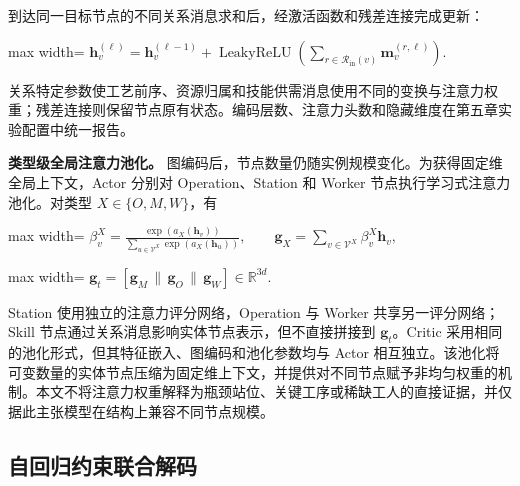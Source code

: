 \documentclass[journal,10pt]{IEEEtran}
\begin{document}
到达同一目标节点的不同关系消息求和后，经激活函数和残差连接完成更新：

\begin{center}
\begin{adjustbox}{max width=\columnwidth}
$\displaystyle
\mathbf h_v^{(\ell)}=
\mathbf h_v^{(\ell-1)}+
\operatorname{LeakyReLU}\!\left(
\sum_{r\in\mathcal R_{\mathrm{in}}(v)}
\mathbf m_v^{(r,\ell)}
\right).
$
\end{adjustbox}
\end{center}

关系特定参数使工艺前序、资源归属和技能供需消息使用不同的变换与注意力权重；残差连接则保留节点原有状态。编码层数、注意力头数和隐藏维度在第五章实验配置中统一报告。

\textbf{类型级全局注意力池化。} 图编码后，节点数量仍随实例规模变化。为获得固定维全局上下文，Actor 分别对 Operation、Station 和 Worker 节点执行学习式注意力池化。对类型 \(X\in\lbrace{}O,M,W\rbrace{}\)，有

\begin{center}
\begin{adjustbox}{max width=\columnwidth}
$\displaystyle
\beta_v^{X}=
\frac{\exp\!\left(a_X(\mathbf h_v)\right)}
{\displaystyle\sum_{u\in\mathcal V^{X}}
\exp\!\left(a_X(\mathbf h_u)\right)},
\qquad
\mathbf g_X=\sum_{v\in\mathcal V^{X}}\beta_v^{X}\mathbf h_v,
$
\end{adjustbox}
\end{center}

\begin{center}
\begin{adjustbox}{max width=\columnwidth}
$\displaystyle
\mathbf g_t=
\left[
\mathbf g_M\,\|\,\mathbf g_O\,\|\,\mathbf g_W
\right]\in\mathbb R^{3d}.
$
\end{adjustbox}
\end{center}

Station 使用独立的注意力评分网络，Operation 与 Worker 共享另一评分网络；Skill 节点通过关系消息影响实体节点表示，但不直接拼接到 \(\mathbf g_t\)。Critic 采用相同的池化形式，但其特征嵌入、图编码和池化参数均与 Actor 相互独立。该池化将可变数量的实体节点压缩为固定维上下文，并提供对不同节点赋予非均匀权重的机制。本文不将注意力权重解释为瓶颈站位、关键工序或稀缺工人的直接证据，并仅据此主张模型在结构上兼容不同节点规模。

\subsection{自回归约束联合解码}\label{ux81eaux56deux5f52ux7ea6ux675fux8054ux5408ux89e3ux7801}
\end{document}
